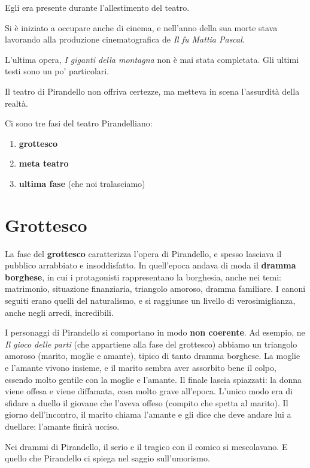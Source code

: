 \documentclass[a4paper, twoside, titlepage]{book}
\newcounter{mar}
\begin{document}
Egli era presente durante l’allestimento del teatro.

Si è iniziato a occupare anche di cinema, e nell’anno della sua morte stava lavorando alla produzione cinematografica de \textit{Il fu Mattia Pascal}.

L’ultima opera, \textit{I giganti della montagna} non è mai stata completata.
Gli ultimi testi sono un po’ particolari.

Il teatro di Pirandello non offriva certezze, ma metteva in scena l’assurdità della realtà.

Ci sono tre fasi del teatro Pirandelliano:
\begin{enumerate}
\item \textbf{grottesco}
\item \textbf{meta teatro}
\item \textbf{ultima fase} (che noi tralasciamo)
\end{enumerate}

\section{Grottesco}

La fase del \textbf{grottesco} caratterizza l’opera di Pirandello, e spesso lasciava il pubblico arrabbiato e insoddisfatto.
In quell’epoca andava di moda il \textbf{dramma borghese}, in cui i protagonisti rappresentano la borghesia, anche nei temi: matrimonio, situazione finanziaria, triangolo amoroso, dramma familiare. I canoni seguiti erano quelli del naturalismo, e si raggiunse un livello di verosimiglianza, anche negli arredi, incredibili.

I personaggi di Pirandello si comportano in modo \textbf{non coerente}. Ad esempio, ne \textit{Il gioco delle parti} (che appartiene alla fase del grottesco) abbiamo un triangolo amoroso (marito, moglie e amante), tipico di tanto dramma borghese.
La moglie e l’amante vivono insieme, e il marito sembra aver assorbito bene il colpo, essendo molto gentile con la moglie e l’amante.
Il finale lascia spiazzati: la donna viene offesa e viene diffamata, cosa molto grave all’epoca. L’unico modo era di sfidare a duello il giovane che l’aveva offeso (compito che spetta al marito).
Il giorno dell’incontro, il marito chiama l’amante e gli dice che deve andare lui a duellare: l’amante finirà ucciso.

Nei drammi di Pirandello, il serio e il tragico con il comico si mescolavano. E quello che Pirandello ci spiega nel saggio sull’umorismo.
\end{document}
